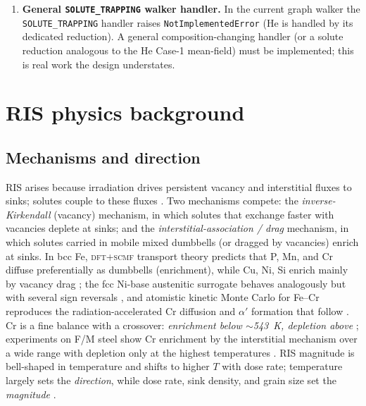 \documentclass[11pt]{article}
\newcommand{\code}[1]{\texttt{#1}}
\begin{document}
\begin{enumerate}[leftmargin=1.6em]
solute-trapping factor that sets $\omega^{\rm eff}$. Once Cr is dynamic and
partitions into $\alpha'$, the bulk Cr that feeds trapping changes. For v2.1 we
recommend decoupling: keep the trapping factor on the (nearly constant) bulk Cr
to first order, and track a separate partitioned-Cr inventory; revisit full
self-consistency only if bulk Cr depletion exceeds a few percent.
\item \textbf{General \code{SOLUTE\_TRAPPING} walker handler.} In the current
graph walker the \code{SOLUTE\_TRAPPING} handler raises
\code{NotImplementedError} (He is handled by its dedicated reduction). A
general composition-changing handler (or a solute reduction analogous to the He
Case-1 mean-field) must be implemented; this is real work the design understates.
\end{enumerate}

\section{RIS physics background}
\label{sec:ris-physics}
\subsection{Mechanisms and direction}
RIS arises because irradiation drives persistent vacancy and interstitial
fluxes to sinks; solutes couple to these fluxes
\citep{WiedersichOkamotoLam1979,Marwick1978,Was2017,ArdellBellon2016}. Two mechanisms
compete: the \emph{inverse-Kirkendall} (vacancy) mechanism, in which solutes
that exchange faster with vacancies deplete at sinks; and the
\emph{interstitial-association / drag} mechanism, in which solutes carried in
mobile mixed dumbbells (or dragged by vacancies) enrich at sinks. In bcc Fe,
\textsc{dft}+\textsc{scmf} transport theory predicts that P, Mn, and Cr diffuse
preferentially as dumbbells (enrichment), while Cu, Ni, Si enrich mainly by
vacancy drag \citep{Messina2020}; the fcc Ni-base austenitic surrogate behaves
analogously but with several sign reversals \citep{Toijer2021}, and atomistic
kinetic Monte Carlo for Fe--Cr reproduces the radiation-accelerated Cr diffusion
and $\alpha'$ formation that follow \citep{Senninger2016,SoissonJourdan2016}.
Cr is a fine balance with a crossover:
\emph{enrichment below $\sim$543~K, depletion above}
\citep{Messina2020}; experiments on F/M steel show Cr enrichment by the
interstitial mechanism over a wide range with depletion only at the highest
temperatures \citep{WharryWas2014,WharryWas2013}. RIS magnitude is bell-shaped
in temperature and shifts to higher $T$ with dose rate; temperature largely
sets the \emph{direction}, while dose rate, sink density, and grain size set the
\emph{magnitude} \citep{Oplinger2026}.
\end{document}
